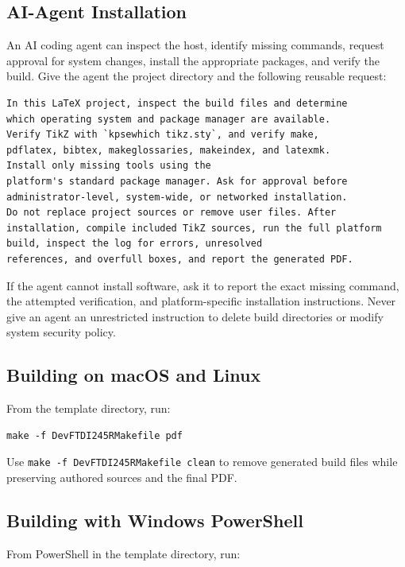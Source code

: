 \subsection{AI-Agent Installation}
\label{Section:AIAgentInstallation}

An AI coding agent can inspect the host, identify missing commands, request
approval for system changes, install the appropriate packages, and verify the
build. Give the agent the project directory and the following reusable request:

\begin{verbatim}
In this LaTeX project, inspect the build files and determine
which operating system and package manager are available.
Verify TikZ with `kpsewhich tikz.sty`, and verify make,
pdflatex, bibtex, makeglossaries, makeindex, and latexmk.
Install only missing tools using the
platform's standard package manager. Ask for approval before
administrator-level, system-wide, or networked installation.
Do not replace project sources or remove user files. After
installation, compile included TikZ sources, run the full platform
build, inspect the log for errors, unresolved
references, and overfull boxes, and report the generated PDF.
\end{verbatim}

If the agent cannot install software, ask it to report the exact missing
command, the attempted verification, and platform-specific installation
instructions. Never give an agent an unrestricted instruction to delete build
directories or modify system security policy.

\subsection{Building on macOS and Linux}

From the template directory, run:

\begin{verbatim}
make -f DevFTDI245RMakefile pdf
\end{verbatim}

Use \texttt{make -f DevFTDI245RMakefile clean} to remove generated build files while preserving authored sources and the final PDF.

\subsection{Building with Windows PowerShell}

From PowerShell in the template directory, run:

